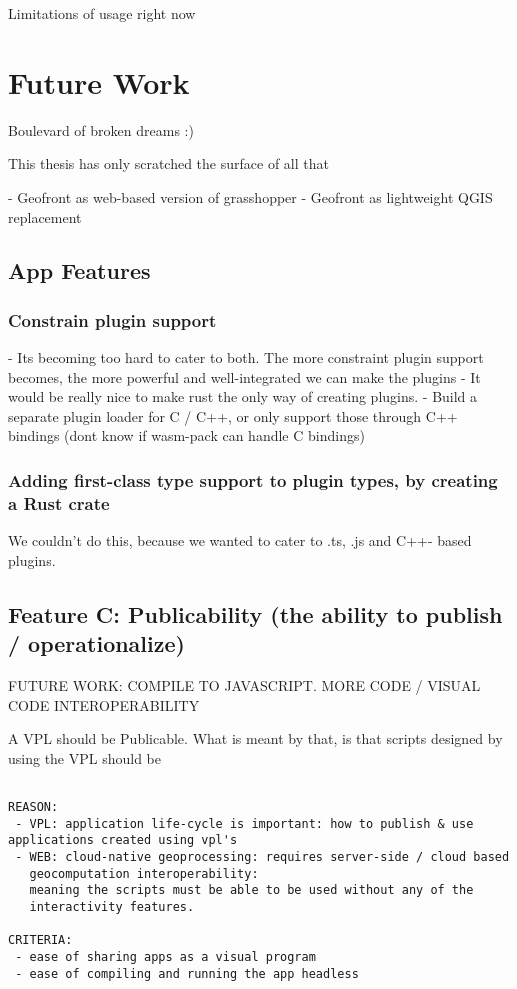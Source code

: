 Limitations of usage right now



\section{Future Work}
Boulevard of broken dreams :) 

This thesis has only scratched the surface of all that

- Geofront as web-based version of grasshopper
- Geofront as lightweight QGIS replacement 





\subsection{App Features}

\subsubsection{ Constrain plugin support}
- Its becoming too hard to cater to both. The more constraint plugin support becomes, the more powerful and well-integrated we can make the plugins
- It would be really nice to make rust the only way of creating plugins. 
- Build a separate plugin loader for C / C++, or only support those through C++ bindings (dont know if wasm-pack can handle C bindings)


\subsubsection{Adding first-class type support to plugin types, by creating a Rust crate }
We couldn't do this, because we wanted to cater to .ts, .js and C++- based plugins.




\subsection*{Feature C: Publicability (the ability to publish / operationalize) } 
FUTURE WORK: COMPILE TO JAVASCRIPT. MORE CODE / VISUAL CODE INTEROPERABILITY

A VPL should be Publicable. What is meant by that, is that scripts designed by using the VPL should be 

\begin{lstlisting}

REASON: 
 - VPL: application life-cycle is important: how to publish & use applications created using vpl's
 - WEB: cloud-native geoprocessing: requires server-side / cloud based
   geocomputation interoperability: 
   meaning the scripts must be able to be used without any of the 
   interactivity features.

CRITERIA:
 - ease of sharing apps as a visual program
 - ease of compiling and running the app headless
\end{lstlisting}





